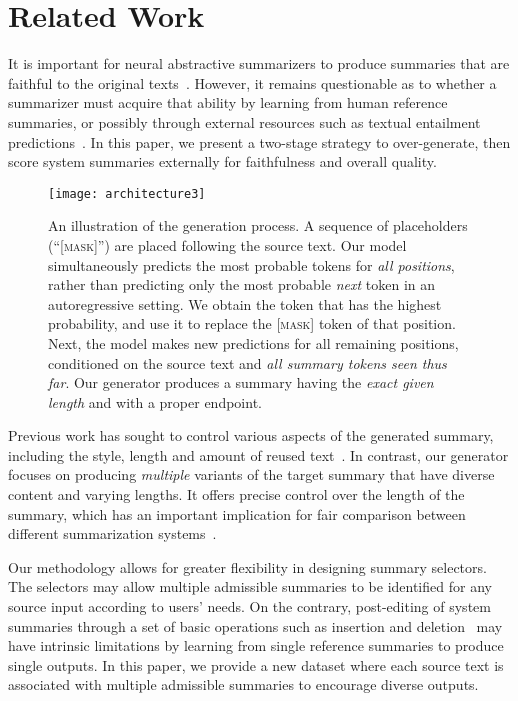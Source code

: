 \documentclass[11pt]{article}
\begin{document}
\section{Related Work}
\label{sec:related}

It is important for neural abstractive summarizers to produce summaries that are faithful to the original texts~\cite{cao-etal-2017-fsum,kryscinski-etal-2019-neural,lebanoff-etal-2019-analyzing,wang-etal-2020-asking,dong-etal-2020-multi,zhang-etal-2020-optimizing}.
However, it remains questionable as to whether a summarizer must acquire that ability by learning from human reference summaries, or possibly through external resources such as textual entailment predictions~\cite{falke-etal-2019-ranking}.
In this paper, we present a two-stage strategy to over-generate, then score system summaries externally for faithfulness and overall quality. 


\begin{figure*}[t]
\centering
\texttt{[image: architecture3]}
\caption{
An illustration of the generation process.
A sequence of placeholders (``\textsc{[mask]}'') are placed following the source text.
Our model simultaneously predicts the most probable tokens for \emph{all positions}, rather than predicting only the most probable \emph{next} token in an autoregressive setting.
We obtain the token that has the highest probability, and use it to replace the \textsc{[mask]} token of that position.
Next, the model makes new predictions for all remaining positions, conditioned on the source text and \emph{all summary tokens seen thus far}.
Our generator produces a summary having the \emph{exact given length} and with a proper endpoint.
}
\label{fig:architecture}
\end{figure*}


Previous work has sought to control various aspects of the generated summary, including the style, length and amount of reused text~\cite{kikuchi-etal-2016-controlling,hu2017,fan-etal-2018-controllable,keskarCTRL2019,makino-etal-2019-global,Song:2020:Copy}.
In contrast, our generator focuses on producing \emph{multiple} variants of the target summary that have diverse content and varying lengths.
It offers precise control over the length of the summary, which has an important implication for fair comparison between different summarization systems~\cite{napoles-etal-2011-evaluating,shapira-etal-2018-evaluating}.


Our methodology allows for greater flexibility in designing summary selectors.
The selectors may allow multiple admissible summaries to be identified for any source input according to users' needs.
On the contrary, post-editing of system summaries through a set of basic operations such as insertion and deletion~\cite{NIPS2019_9297,malmi-etal-2019-encode,dong-etal-2019-editnts,correia-martins-2019-simple} may have intrinsic limitations by learning from single reference summaries to produce single outputs.
In this paper, we provide a new dataset where each source text is associated with multiple admissible summaries to encourage diverse outputs.
\end{document}
